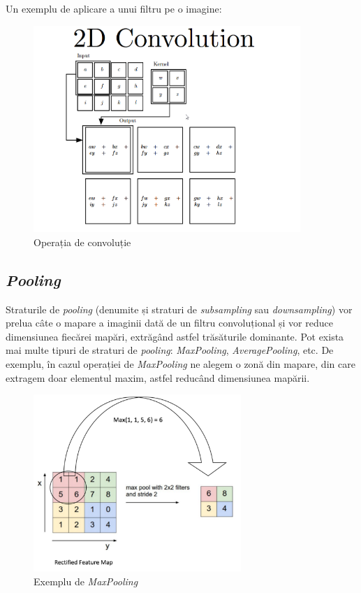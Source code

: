  Un exemplu de aplicare a unui filtru pe o imagine:
 
 \begin{figure}[!htbp]
    \begin{center}
        \includegraphics[width=0.9\textwidth]{images/filtru.png}
        \caption{Operația de convoluție \cite{Goodfellow-et-al-2016}}
    \end{center}
\end{figure}


\subsection{\textit{Pooling}}
Straturile de \textit{pooling} (denumite și straturi de \textit{subsampling} sau \textit{downsampling}) vor prelua câte o mapare a imaginii dată de un filtru convoluțional și vor reduce dimensiunea fiecărei mapări, extrăgând astfel trăsăturile dominante. Pot exista mai multe tipuri de straturi de \textit{pooling}: \textit{MaxPooling}, \textit{AveragePooling}, etc. De exemplu, în cazul operației de \textit{MaxPooling} ne alegem o zonă din mapare, din care extragem doar elementul maxim, astfel reducând dimensiunea mapării.

\begin{figure}[!htbp]
    \begin{center}
        \includegraphics[width=0.7\textwidth]{images/pooling.png}
        \caption{Exemplu de \textit{MaxPooling}\cite{intuitive-explanation-conv}}
    \end{center}
\end{figure}

